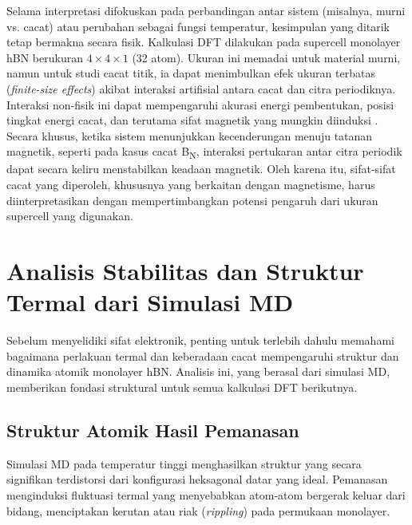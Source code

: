 Selama interpretasi difokuskan pada perbandingan antar sistem (misalnya, murni vs. cacat) atau perubahan sebagai fungsi temperatur, kesimpulan yang ditarik tetap bermakna secara fisik.
Kalkulasi DFT dilakukan pada supercell monolayer hBN berukuran $4 \times 4 \times 1$ (32 atom).
Ukuran ini memadai untuk material murni, namun untuk studi cacat titik, ia dapat menimbulkan efek ukuran terbatas (\emph{finite-size effects}) akibat interaksi artifisial antara cacat dan citra periodiknya.
Interaksi non-fisik ini dapat mempengaruhi akurasi energi pembentukan, posisi tingkat energi cacat, dan terutama sifat magnetik yang mungkin diinduksi \cite{Freysoldt2014}.
Secara khusus, ketika sistem menunjukkan kecenderungan menuju tatanan magnetik, seperti pada kasus cacat B\textsubscript{N}, interaksi pertukaran antar citra periodik dapat secara keliru menstabilkan keadaan magnetik.
Oleh karena itu, sifat-sifat cacat yang diperoleh, khususnya yang berkaitan dengan magnetisme, harus diinterpretasikan dengan mempertimbangkan potensi pengaruh dari ukuran supercell yang digunakan.

\section{Analisis Stabilitas dan Struktur Termal dari Simulasi MD}
\label{sec:analisis_md}
Sebelum menyelidiki sifat elektronik, penting untuk terlebih dahulu memahami bagaimana perlakuan termal dan keberadaan cacat mempengaruhi struktur dan dinamika atomik monolayer hBN.
Analisis ini, yang berasal dari simulasi MD, memberikan fondasi struktural untuk semua kalkulasi DFT berikutnya.
\subsection{Struktur Atomik Hasil Pemanasan}
\label{subsec:md_struktur}
Simulasi MD pada temperatur tinggi menghasilkan struktur yang secara signifikan terdistorsi dari konfigurasi heksagonal datar yang ideal.
Pemanasan menginduksi fluktuasi termal yang menyebabkan atom-atom bergerak keluar dari bidang, menciptakan kerutan atau riak (\emph{rippling}) pada permukaan monolayer.

